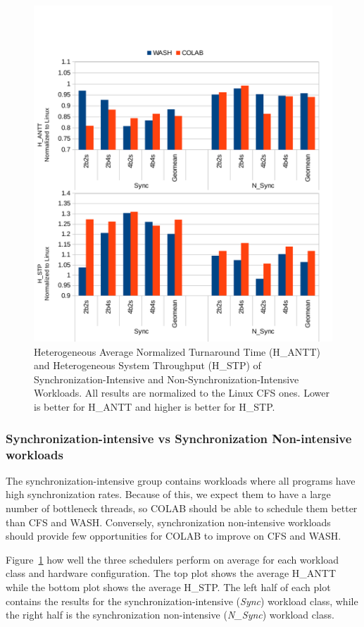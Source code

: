 \begin{figure}
\centering
\includegraphics[scale=0.55]{figures/sync.pdf}
\caption{Heterogeneous Average Normalized Turnaround Time (H\_ANTT) and Heterogeneous System Throughput (H\_STP) of Synchronization-Intensive and Non-Synchronization-Intensive Workloads. All results are normalized to the Linux CFS ones. Lower is better for H\_ANTT and higher is better for H\_STP.}
\label{sync}
\end{figure} 

\subsubsection{Synchronization-intensive vs Synchronization Non-intensive workloads}
The synchronization-intensive group contains workloads where all programs have high synchronization rates. Because of this, we expect them to have a large number of bottleneck threads, so COLAB should be able to schedule them better than CFS and WASH. Conversely, synchronization non-intensive workloads should provide few opportunities for COLAB to improve on CFS and WASH.

Figure~\ref{sync} how well the three schedulers perform on average for each workload class and hardware configuration. The top plot shows the 
average H\_ANTT while the bottom plot shows the average H\_STP. The left half of each plot contains the results for the synchronization-intensive (\emph{Sync}) workload class, while the right half is the synchronization non-intensive (\emph{N\_Sync}) workload class.

